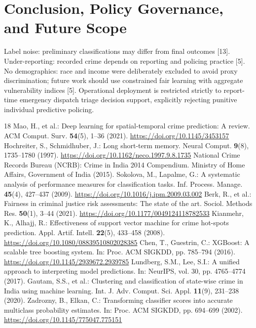 \documentclass[runningheads]{llncs}
\begin{document}
\section{Conclusion, Policy Governance, and Future Scope}
Label noise: preliminary classifications may differ from final outcomes [13]. Under-reporting: recorded crime depends on reporting and policing practice [5]. No demographics: race and income were deliberately excluded to avoid proxy discrimination; future work should use constrained fair learning with aggregate vulnerability indices [5]. Operational deployment is restricted strictly to report-time emergency dispatch triage decision support, explicitly rejecting punitive individual predictive policing.

\begin{thebibliography}{18}
 Mao, H., et al.: Deep learning for spatial-temporal crime prediction: A review. ACM Comput. Surv. \textbf{54}(5), 1--36 (2021). \url{https://doi.org/10.1145/3453157}
 Hochreiter, S., Schmidhuber, J.: Long short-term memory. Neural Comput. \textbf{9}(8), 1735--1780 (1997). \url{https://doi.org/10.1162/neco.1997.9.8.1735}
 National Crime Records Bureau (NCRB): Crime in India 2014 Compendium. Ministry of Home Affairs, Government of India (2015).
 Sokolova, M., Lapalme, G.: A systematic analysis of performance measures for classification tasks. Inf. Process. Manage. \textbf{45}(4), 427--437 (2009). \url{https://doi.org/10.1016/j.ipm.2009.03.002}
 Berk, R., et al.: Fairness in criminal justice risk assessments: The state of the art. Sociol. Methods Res. \textbf{50}(1), 3--44 (2021). \url{https://doi.org/10.1177/0049124118782533}
 Kianmehr, K., Alhajj, R.: Effectiveness of support vector machine for crime hot-spots prediction. Appl. Artif. Intell. \textbf{22}(5), 433--458 (2008). \url{https://doi.org/10.1080/08839510802028385}
 Chen, T., Guestrin, C.: XGBoost: A scalable tree boosting system. In: Proc. ACM SIGKDD, pp. 785--794 (2016). \url{https://doi.org/10.1145/2939672.2939785}
 Lundberg, S.M., Lee, S.I.: A unified approach to interpreting model predictions. In: NeurIPS, vol. 30, pp. 4765--4774 (2017).
 Gautam, S.S., et al.: Clustering and classification of state-wise crime in India using machine learning. Int. J. Adv. Comput. Sci. Appl. \textbf{11}(9), 231--238 (2020).
 Zadrozny, B., Elkan, C.: Transforming classifier scores into accurate multiclass probability estimates. In: Proc. ACM SIGKDD, pp. 694--699 (2002). \url{https://doi.org/10.1145/775047.775151}

\end{thebibliography}
\end{document}
